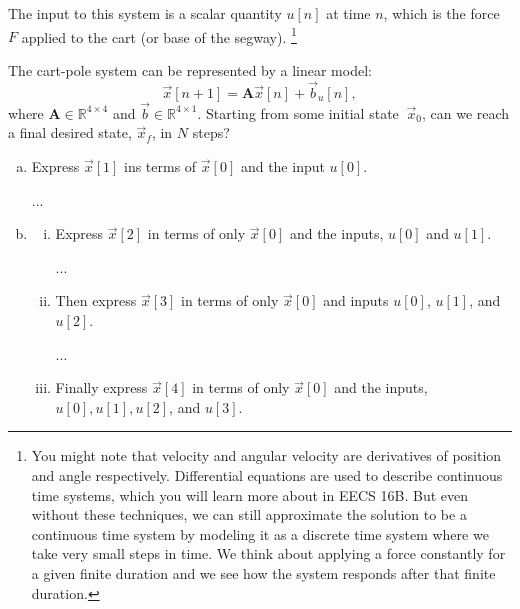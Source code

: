 \documentclass[11pt]{article}
\def\R{\mathbb{R}} %
\def\A{\textbf{A}} %
\begin{document}
\begin{enumerate}
\begin{enumerate}
	      	The input to this system is a scalar quantity $u[n]$ at time $n$, which is the force $F$ applied to the cart (or base of the segway). \footnote{You might note that velocity and angular velocity are derivatives of position and angle respectively. Differential equations are used to describe continuous time systems, which you will learn more about in EECS 16B. But even without these techniques, we can still approximate the solution to be a continuous time system by modeling it as a discrete time system where we take very small steps in time. We think about applying a force constantly for a given finite duration and we see how the system responds after that finite duration.}
	      	
	      	The cart-pole system can be represented by a linear model:
	      	\begin{equation}
	      	    \vec x[n+1] = \A\vec x[n] +\vec b_u[n],
	      	\end{equation}
	      	where $\A \in \R^{4\times4}$ and $\vec b \in \R^{4\times 1}$. Starting from some initial state $~\vec x_0$, can we reach a final desired state, $\vec x_f$, in $N$ steps?
	      	\begin{enumerate}[(a)]
	      	    \item Express $\vec{x}[1]$ ins terms of $\vec{x}[0]$ and the input $u[0]$.
	      	    \begin{Answer}
	      	        ...
	      	    \end{Answer}
	      	    
	      	    \newpage
	      	    
	      	    \item \begin{enumerate}[i.]
	      	        \item Express $\vec x[2]$ in terms of only $\vec x[0]$ and the inputs, $u[0]$ and $u[1]$.
	      	        \begin{Answer}
	      	            ...
	      	        \end{Answer}
	      	        
	      	        \vspace{10px}
	      	        \item Then express $\vec x[3]$ in terms of only $\vec x[0]$ and inputs $u[0]$, $u[1]$, and $u[2]$.
                    \begin{Answer}
	      	            ...
	      	        \end{Answer}
	      	        
	      	        \vspace{10px}
	      	        \item Finally express $\vec x[4]$ in terms of only $\vec x[0]$ and the inputs, $u[0], u[1], u[2]$, and $u[3]$.
                    

\end{enumerate}
\end{enumerate}
\end{enumerate}
\end{enumerate}
\end{document}
